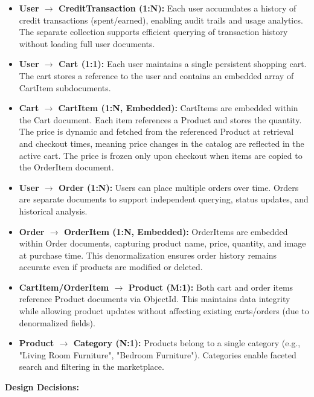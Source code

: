 \begin{itemize}
    \item \textbf{User $\rightarrow$ CreditTransaction (1:N):} Each user accumulates a history of credit transactions (spent/earned), enabling audit trails and usage analytics. The separate collection supports efficient querying of transaction history without loading full user documents.
    
    \item \textbf{User $\rightarrow$ Cart (1:1):} Each user maintains a single persistent shopping cart. The cart stores a reference to the user and contains an embedded array of CartItem subdocuments.
    
    \item \textbf{Cart $\rightarrow$ CartItem (1:N, Embedded):} CartItems are embedded within the Cart document. Each item references a Product and stores the quantity. The price is dynamic and fetched from the referenced Product at retrieval and checkout times, meaning price changes in the catalog are reflected in the active cart. The price is frozen only upon checkout when items are copied to the OrderItem document.
    
    \item \textbf{User $\rightarrow$ Order (1:N):} Users can place multiple orders over time. Orders are separate documents to support independent querying, status updates, and historical analysis.
    
    \item \textbf{Order $\rightarrow$ OrderItem (1:N, Embedded):} OrderItems are embedded within Order documents, capturing product name, price, quantity, and image at purchase time. This denormalization ensures order history remains accurate even if products are modified or deleted.
    
    \item \textbf{CartItem/OrderItem $\rightarrow$ Product (M:1):} Both cart and order items reference Product documents via ObjectId. This maintains data integrity while allowing product updates without affecting existing carts/orders (due to denormalized fields).
    
    \item \textbf{Product $\rightarrow$ Category (N:1):} Products belong to a single category (e.g., "Living Room Furniture", "Bedroom Furniture"). Categories enable faceted search and filtering in the marketplace.
\end{itemize}

\textbf{Design Decisions:}

